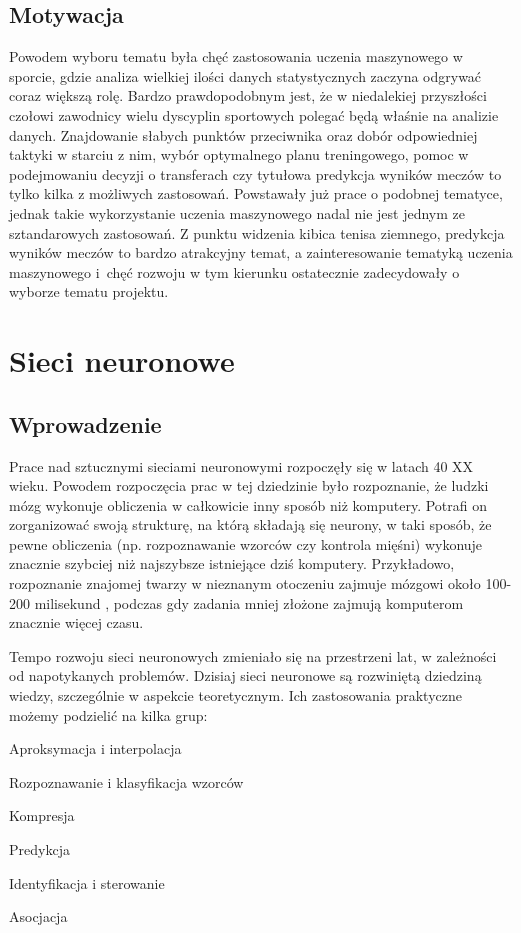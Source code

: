 \section{Motywacja}
\label{Sec:Motiv}
Powodem wyboru tematu była chęć zastosowania uczenia maszynowego w sporcie, gdzie analiza wielkiej ilości danych statystycznych zaczyna odgrywać coraz większą rolę. Bardzo prawdopodobnym jest, że w niedalekiej przyszłości czołowi zawodnicy wielu dyscyplin sportowych polegać będą właśnie na analizie danych. Znajdowanie słabych punktów przeciwnika oraz dobór odpowiedniej taktyki w starciu z nim, wybór optymalnego planu treningowego, pomoc w podejmowaniu decyzji o transferach czy tytułowa predykcja wyników meczów to tylko kilka z możliwych zastosowań.  Powstawały już prace o podobnej tematyce, jednak takie wykorzystanie uczenia maszynowego nadal nie jest jednym ze sztandarowych zastosowań. Z punktu widzenia kibica tenisa ziemnego, predykcja wyników meczów to bardzo atrakcyjny temat, a zainteresowanie tematyką uczenia maszynowego i~chęć rozwoju w tym kierunku ostatecznie zadecydowały o wyborze tematu projektu.


\chapter{Sieci neuronowe}
\section{Wprowadzenie}
\label{Sec:ThIntro}
Prace nad sztucznymi sieciami neuronowymi rozpoczęły się w latach 40 XX wieku.\cite{osow01} Powodem rozpoczęcia prac w tej dziedzinie było rozpoznanie, że ludzki mózg wykonuje obliczenia w całkowicie inny sposób niż komputery. Potrafi on zorganizować swoją strukturę, na którą składają się neurony, w taki sposób, że pewne obliczenia (np. rozpoznawanie wzorców czy kontrola mięśni) wykonuje znacznie szybciej niż najszybsze istniejące dziś komputery. Przykładowo, rozpoznanie znajomej twarzy w nieznanym otoczeniu zajmuje mózgowi około 100-200 milisekund \cite{hayk01}, podczas gdy zadania mniej złożone zajmują komputerom znacznie więcej czasu. 

Tempo rozwoju sieci neuronowych zmieniało się na przestrzeni lat, w zależności od napotykanych problemów. Dzisiaj sieci neuronowe są rozwiniętą dziedziną wiedzy, szczególnie w aspekcie teoretycznym\cite{osow01}. Ich zastosowania praktyczne możemy podzielić na kilka grup:
\begin{tightitemize}
\item Aproksymacja i interpolacja
\item Rozpoznawanie i klasyfikacja wzorców
\item Kompresja
\item Predykcja
\item Identyfikacja i sterowanie
\item Asocjacja
\end{tightitemize}

